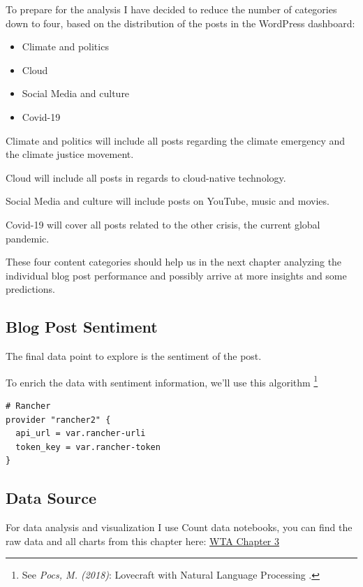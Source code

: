 To prepare for the analysis I have decided to reduce the number of categories down to four, based on the distribution of the posts in the WordPress dashboard:

\begin{itemize}
\item Climate and politics
\item Cloud
\item Social Media and culture
\item Covid-19
\end{itemize}

Climate and politics will include all posts regarding the climate emergency and the climate justice movement.

Cloud will include all posts in regards to cloud-native technology.

Social Media and culture will include posts on YouTube, music and movies.

Covid-19 will cover all posts related to the other crisis, the current global pandemic.

These four content categories should help us in the next chapter analyzing the individual blog post performance and possibly arrive at more insights and some predictions.

\subsection{Blog Post Sentiment}

The final data point to explore is the sentiment of the post.

To enrich the data with sentiment information, we'll use this algorithm \footnote{See \textit{Pocs, M. (2018)}: Lovecraft with Natural Language Processing .\cite{lovecraftAnalysis}}

\begin{lstlisting}[caption=Rancher Provider, frame=single, basicstyle=\ttfamily]
# Rancher
provider "rancher2" {
  api_url = var.rancher-urli
  token_key = var.rancher-token
}
\end{lstlisting}

\subsection{Data Source}

For data analysis and visualization I use Count data notebooks, you can find the raw data and all charts from this chapter here: \href{https://count.co/n/6WKuBzDV4Qq}{WTA Chapter 3}
